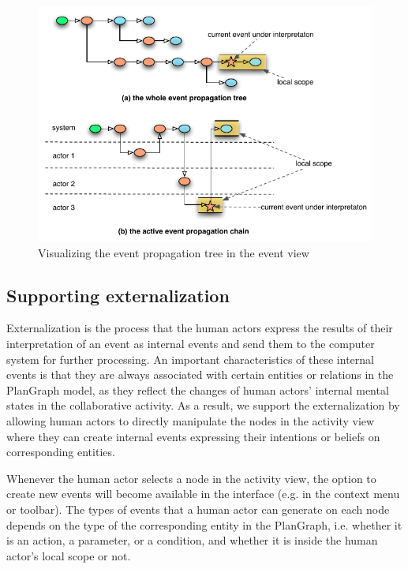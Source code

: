 \begin{figure}[htbp] %
	\centering
	\includegraphics{extended_event_view.pdf} 
	\caption{Visualizing the event propagation tree in the event view}
	\label{fig:extended_event_view}
\end{figure}

\subsection{Supporting externalization} %
\label{sub:supporting_externalization}
Externalization is the process that the human actors express the results of their interpretation of an event as internal events and send them to the computer system for further processing. An important characteristics of these internal events is that they are always associated with certain entities or relations in the PlanGraph model, as they reflect the changes of human actors' internal mental states in the collaborative activity. As a result, we support the externalization by allowing human actors to directly manipulate the nodes in the activity view where they can create internal events expressing their intentions or beliefs on corresponding entities.

Whenever the human actor selects a node in the activity view, the option to create new events will become available in the interface (e.g. in the context menu or toolbar). The types of events that a human actor can generate on each node depends on the type of the corresponding entity in the PlanGraph, i.e. whether it is an action, a parameter, or a condition, and whether it is inside the human actor's local scope or not. 

